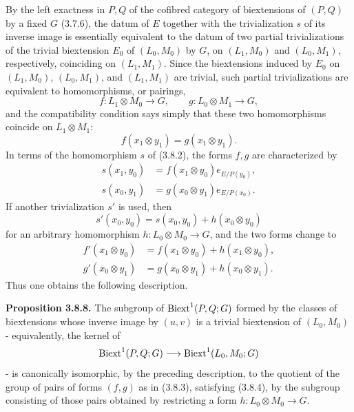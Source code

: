 \documentclass[11pt]{article}
\begin{document}
By the left exactness in \(P,Q\) of the cofibred category of biextensions of \((P,Q)\) by a fixed \(G\) (3.7.6), the datum of \(E\) together with the trivialization \(s\) of its inverse image is essentially equivalent to the datum of two partial trivializations of the trivial biextension \(E_0\) of \((L_0,M_0)\) by \(G\), on \((L_1,M_0)\) and \((L_0,M_1)\), respectively, coinciding on \((L_1,M_1)\).  Since the biextensions induced by \(E_0\) on \((L_1,M_0)\), \((L_0,M_1)\), and \((L_1,M_1)\) are trivial, such partial trivializations are equivalent to homomorphisms, or pairings,
\begin{equation}\tag{3.8.3}
        f:L_1\otimes M_0\longrightarrow G,
        \qquad
        g:L_0\otimes M_1\longrightarrow G,
\end{equation}
and the compatibility condition says simply that these two homomorphisms coincide on \(L_1\otimes M_1\):
\begin{equation}\tag{3.8.4}
        f(x_1\otimes y_1)=g(x_1\otimes y_1).
\end{equation}
In terms of the homomorphism \(s\) of (3.8.2), the forms \(f,g\) are characterized by
\begin{equation}\tag{3.8.5}
\begin{aligned}
 s(x_1,y_0)&=f(x_1\otimes y_0)e_{E/P(y_0)},\\
 s(x_0,y_1)&=g(x_0\otimes y_1)e_{E/P(x_0)}.
\end{aligned}
\end{equation}
If another trivialization \(s'\) is used, then
\begin{equation}\tag{3.8.6}
        s'(x_0,y_0)=s(x_0,y_0)+h(x_0\otimes y_0)
\end{equation}
for an arbitrary homomorphism \(h:L_0\otimes M_0\to G\), and the two forms change to
\begin{equation}\tag{3.8.7}
\begin{aligned}
 f'(x_1\otimes y_0)&=f(x_1\otimes y_0)+h(x_1\otimes y_0),\\
 g'(x_0\otimes y_1)&=g(x_0\otimes y_1)+h(x_0\otimes y_1).
\end{aligned}
\end{equation}
Thus one obtains the following description.

\textbf{Proposition 3.8.8.}  The subgroup of \(\operatorname{Biext}^1(P,Q;G)\) formed by the classes of biextensions whose inverse image by \((u,v)\) is a trivial biextension of \((L_0,M_0)\) - equivalently, the kernel of
\[
        \operatorname{Biext}^1(P,Q;G)\longrightarrow \operatorname{Biext}^1(L_0,M_0;G)
\]
- is canonically isomorphic, by the preceding description, to the quotient of the group of pairs of forms \((f,g)\) as in (3.8.3), satisfying (3.8.4), by the subgroup consisting of those pairs obtained by restricting a form \(h:L_0\otimes M_0\to G\).
\end{document}
